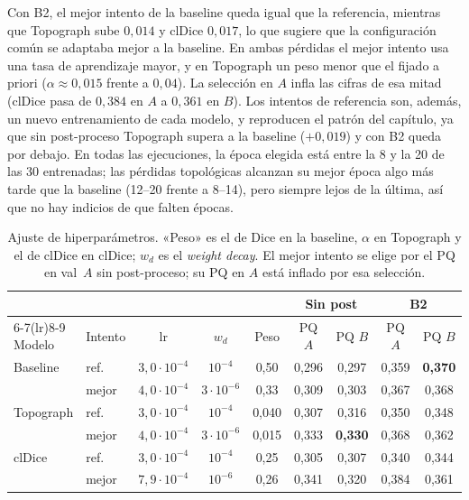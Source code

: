 Con B2, el mejor intento de la baseline queda igual que la referencia,
mientras que Topograph sube $0{,}014$ y clDice $0{,}017$, lo que sugiere
que la configuración común se adaptaba mejor a la baseline. En ambas
pérdidas el mejor intento usa una tasa de aprendizaje mayor, y en
Topograph un peso menor que el fijado a priori ($\alpha\approx0{,}015$
frente a $0{,}04$). La selección en $A$ infla las cifras de esa mitad
(clDice pasa de $0{,}384$ en $A$ a $0{,}361$ en $B$). Los intentos de
referencia son, además, un nuevo entrenamiento de cada modelo, y
reproducen el patrón del capítulo, ya que sin post-proceso Topograph supera a
la baseline ($+0{,}019$) y con B2 queda por debajo. En todas las
ejecuciones, la época elegida está entre la 8 y la 20 de las 30
entrenadas; las pérdidas topológicas alcanzan su mejor época algo más
tarde que la baseline (12--20 frente a 8--14), pero siempre lejos de la
última, así que no hay indicios de que falten épocas.

\begin{table}[htbp]
\centering
\small
\begin{tabular}{@{}llccccccc@{}}
\toprule
 & & & & & \multicolumn{2}{c}{Sin post} & \multicolumn{2}{c}{B2}\\
\cmidrule(lr){6-7}\cmidrule(lr){8-9}
Modelo & Intento & lr & $w_d$ & Peso & PQ $A$ & PQ $B$ & PQ $A$ & PQ $B$\\
\midrule
Baseline & ref. & $3{,}0\cdot10^{-4}$ & $10^{-4}$ & 0,50 & 0,296 & 0,297 & 0,359 & \textbf{0,370}\\
 & mejor & $4{,}0\cdot10^{-4}$ & $3\cdot10^{-6}$ & 0,33 & 0,309 & 0,303 & 0,367 & 0,368\\
\midrule
Topograph & ref. & $3{,}0\cdot10^{-4}$ & $10^{-4}$ & 0,040 & 0,307 & 0,316 & 0,350 & 0,348\\
 & mejor & $4{,}0\cdot10^{-4}$ & $3\cdot10^{-6}$ & 0,015 & 0,333 & \textbf{0,330} & 0,368 & 0,362\\
\midrule
clDice & ref. & $3{,}0\cdot10^{-4}$ & $10^{-4}$ & 0,25 & 0,305 & 0,307 & 0,340 & 0,344\\
 & mejor & $7{,}9\cdot10^{-4}$ & $10^{-6}$ & 0,26 & 0,341 & 0,320 & 0,384 & 0,361\\
\bottomrule
\end{tabular}
\caption{Ajuste de hiperparámetros. «Peso» es el de Dice en la baseline,
$\alpha$ en Topograph y el de clDice en clDice; $w_d$ es el
\emph{weight decay}. El mejor intento se elige por el PQ en val~$A$ sin
post-proceso; su PQ en $A$ está inflado por esa selección.}
\label{tab:res-hp}
\end{table}

